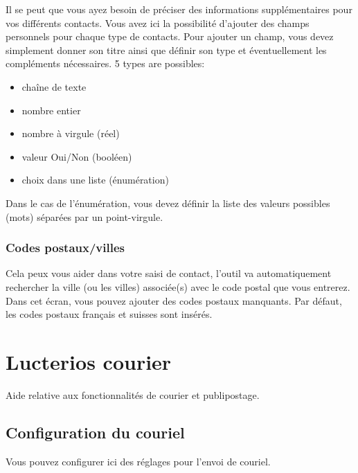 \documentclass[a4paper,10pt,oneside,french]{sphinxmanual}
\begin{document}
Il se peut que vous ayez besoin de préciser des informations supplémentaires pour vos différents contacts. Vous avez ici la possibilité d’ajouter des champs personnels pour chaque type de contacts. Pour ajouter un champ, vous devez simplement donner son titre ainsi que définir son type et éventuellement les compléments nécessaires.
5 types are possibles:
\begin{itemize}
\item {} 
chaîne de texte

\item {} 
nombre entier

\item {} 
nombre à virgule (réel)

\item {} 
valeur Oui/Non (booléen)

\item {} 
choix dans une liste (énumération)

\end{itemize}

Dans le cas de l’énumération, vous devez définir la liste des valeurs possibles (mots) séparées par un point-virgule.


\subsection{Codes postaux/villes}
\label{\detokenize{contacts/configuration:codes-postaux-villes}}
Cela peux vous aider dans votre saisi de contact, l’outil va automatiquement rechercher la ville (ou les villes) associée(s) avec le code postal que vous entrerez.
Dans cet écran, vous pouvez ajouter des codes postaux manquants.
Par défaut, les codes postaux français et suisses sont insérés.


\chapter{Lucterios courier}
\label{\detokenize{mailing/index::doc}}\label{\detokenize{mailing/index:lucterios-courier}}
Aide relative aux fonctionnalités de courier et publipostage.


\section{Configuration du couriel}
\label{\detokenize{mailing/configuration::doc}}\label{\detokenize{mailing/configuration:configuration-du-couriel}}
Vous pouvez configurer ici des réglages pour l’envoi de couriel.
\end{document}
